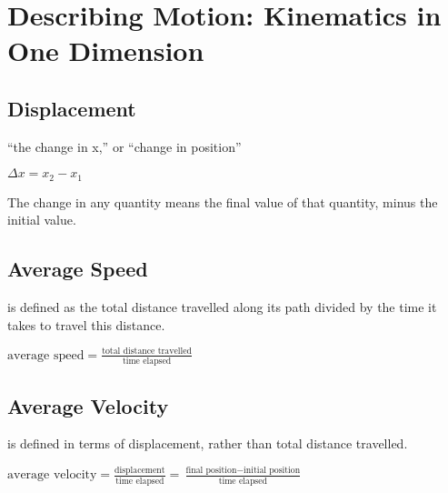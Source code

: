 \documentclass{extarticle}
\begin{document}
 


\newcommand{\markStart}[1][25]{
\begin{tcolorbox}[enhanced jigsaw,sharp corners,coltext=black,colback=BurntOrange!#1!white,boxrule=pt,breakable,size=minimal]
}


\newcommand{\markEnd}[0]{
\end{tcolorbox}
}

\iftoggle{editing}{%
}{%
  \begin{multicols}{3}
}


\setcounter{secnumdepth}{0}



\section{Describing Motion:
Kinematics in One Dimension}

\subsection{Displacement}
“the change in x,” or “change in position” 

$\Delta x = x_2 - x_1$

The change in any quantity means the final value of that quantity, minus the initial value.

\subsection{Average Speed}
is defined as the total distance travelled along its path divided by the time it takes to travel this distance.

$\text{average speed} = \frac{\text{total distance travelled}}{\text{time elapsed}}$

\subsection{Average Velocity}
is defined in terms of displacement, rather than total distance travelled.

$\text{average velocity} = \frac{ \text{displacement} }{ \text{time elapsed} } = \frac{ \text{final position} - \text{initial position} }{ \text{time elapsed} }$
\end{document}
